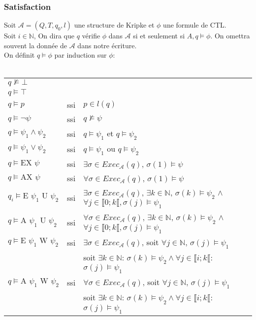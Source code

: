 \documentclass[10pt,a4paper]{article}
\begin{document}
\subsubsection{Satisfaction}
Soit $\mathcal{A} = (Q,T,q_0,l)$ une structure de Kripke et $\phi$ une formule de CTL.\\
Soit $i\in \mathbb{N}$, On dira que $q$ vérifie $\phi$ dans $\mathcal{A}$ si et seulement si $A, q \vDash \phi$. On omettra souvent la donnée de $\mathcal{A}$ dans notre écriture.\\
On définit $q \vDash \phi$ par induction sur $\phi$:\\
\\
\begin{tabular}{lcl}
$q \nvDash \bot$ &&\\
$q \vDash \top$ &&\\
$q \vDash p$ &ssi& $p \in l (q)$\\
$q \vDash \neg \psi$ &ssi& $q \nvDash \psi$\\
$q \vDash \psi_1 \land \psi_2$ &ssi& $q \vDash \psi_1$ et $q \vDash \psi_2$\\
$q \vDash \psi_1 \lor \psi_2$ &ssi& $q \vDash \psi_1$ ou $q \vDash \psi_2$\\
$q \vDash \mbox{EX } \psi$ &ssi& $\exists \sigma \in Exec_\mathcal{A}(q)$, $\sigma(1) \vDash \psi$\\
$q \vDash \mbox{AX } \psi$ &ssi& $\forall \sigma \in Exec_\mathcal{A}(q)$, $\sigma(1) \vDash \psi$\\

$q_{i} \vDash \mbox{E } \psi_1 \mbox{ U } \psi_2$ &ssi& $\exists \sigma \in Exec_\mathcal{A}(q)$, $\exists k \in \mathbb{N}$, $\sigma(k)\vDash \psi_2$ $\land$ $\forall j \in \llbracket 0; k\llbracket, \sigma(j)\vDash \psi_1$\\

$q \vDash \mbox{A } \psi_1 \mbox{ U } \psi_2$ &ssi& $\forall \sigma \in Exec_\mathcal{A}(q)$, $\exists k \in \mathbb{N}$, $\sigma(k)\vDash \psi_2$ $\land$ $\forall j \in \llbracket 0; k\llbracket, \sigma(j)\vDash \psi_1$\\

$q \vDash \mbox{E } \psi_1 \mbox{ W } \psi_2$ &ssi& $\exists \sigma \in Exec_\mathcal{A}(q)$, soit $\forall j \in \mathbb{N}$, $\sigma(j) \vDash \psi_1$\\
& & soit $\exists k\in \mathbb{N}$: $\sigma(k)\vDash \psi_2 \land \forall j \in \llbracket i; k \llbracket$: $\sigma(j) \vDash \psi_1$\\

$q \vDash \mbox{A } \psi_1 \mbox{ W } \psi_2$ &ssi& $\forall \sigma \in Exec_\mathcal{A}(q)$, soit $\forall j \in \mathbb{N}$, $\sigma(j) \vDash \psi_1$\\
& & soit $\exists k\in \mathbb{N}$: $\sigma(k)\vDash \psi_2 \land \forall j \in \llbracket i; k \llbracket$: $\sigma(j) \vDash \psi_1$\\
\end{tabular}
\end{document}

